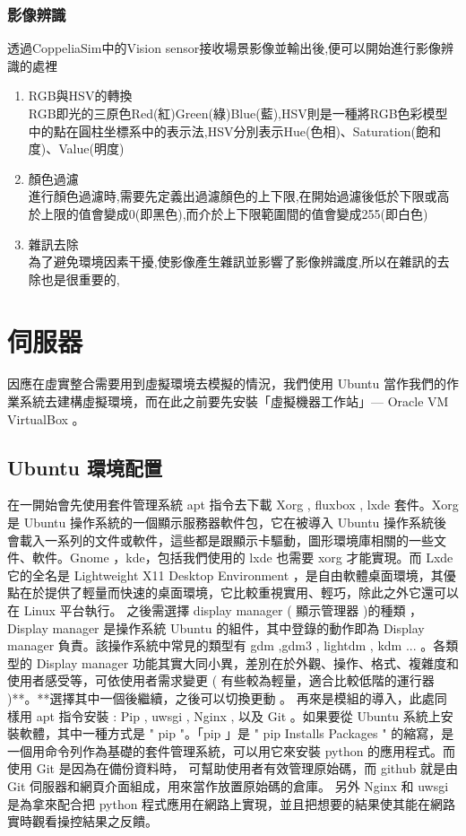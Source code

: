 \documentclass[14pt,a4paper]{report}  %
\begin{document}
\subsection{影像辨識}
\qquad 透過CoppeliaSim中的Vision sensor接收場景影像並輸出後,便可以開始進行影像辨識的處裡\\
\begin{enumerate}
\item RGB與HSV的轉換\\

RGB即光的三原色Red(紅)Green(綠)Blue(藍),HSV則是一種將RGB色彩模型中的點在圓柱坐標系中的表示法,HSV分別表示Hue(色相)、Saturation(飽和度)、Value(明度)\\

\item 顏色過濾\\

進行顏色過濾時,需要先定義出過濾顏色的上下限,在開始過濾後低於下限或高於上限的值會變成0(即黑色),而介於上下限範圍間的值會變成255(即白色)\\

\item 雜訊去除\\

為了避免環境因素干擾,使影像產生雜訊並影響了影像辨識度,所以在雜訊的去除也是很重要的,
\end{enumerate}
\newpage
\chapter{伺服器}
\qquad 因應在虛實整合需要用到虛擬環境去模擬的情況，我們使用 Ubuntu 當作我們的作業系統去建構虛擬環境，而在此之前要先安裝「虛擬機器工作站」— Oracle VM VirtualBox 。\\
\section{Ubuntu 環境配置}
\qquad 在一開始會先使用套件管理系統 apt 指令去下載 Xorg , fluxbox , lxde 套件。Xorg 是 Ubuntu 操作系統的一個顯示服務器軟件包，它在被導入 Ubuntu 操作系統後會載入一系列的文件或軟件，這些都是跟顯示卡驅動，圖形環境庫相關的一些文件、軟件。Gnome ，kde，包括我們使用的 lxde 也需要 xorg 才能實現。而 Lxde  它的全名是 Lightweight X11 Desktop Environment ，是自由軟體桌面環境，其優點在於提供了輕量而快速的桌面環境，它比較重視實用、輕巧，除此之外它還可以在 Linux 平台執行。
\qquad 之後需選擇 display manager ( 顯示管理器 )的種類 ，Display manager 是操作系統 Ubuntu 的組件，其中登錄的動作即為 Display manager 負責。該操作系統中常見的類型有 gdm ,gdm3 , lightdm , kdm ... 。各類型的 Display manager 功能其實大同小異，差別在於外觀、操作、格式、複雜度和使用者感受等，可依使用者需求變更 ( 有些較為輕量，適合比較低階的運行器 )**。**選擇其中一個後繼續，之後可以切換更動 。
\qquad 再來是模組的導入，此處同樣用 apt 指令安裝 : Pip , uwsgi , Nginx  , 以及 Git 。如果要從 Ubuntu 系統上安裝軟體，其中一種方式是 " pip "。「pip 」是 " pip Installs Packages " 的縮寫，是一個用命令列作為基礎的套件管理系統，可以用它來安裝 python 的應用程式。而使用 Git 是因為在備份資料時， 可幫助使用者有效管理原始碼，而 github 就是由 Git 伺服器和網頁介面組成，用來當作放置原始碼的倉庫。
\qquad 另外 Nginx 和 uwsgi 是為拿來配合把 python 程式應用在網路上實現，並且把想要的結果使其能在網路實時觀看操控結果之反饋。
\end{document}
